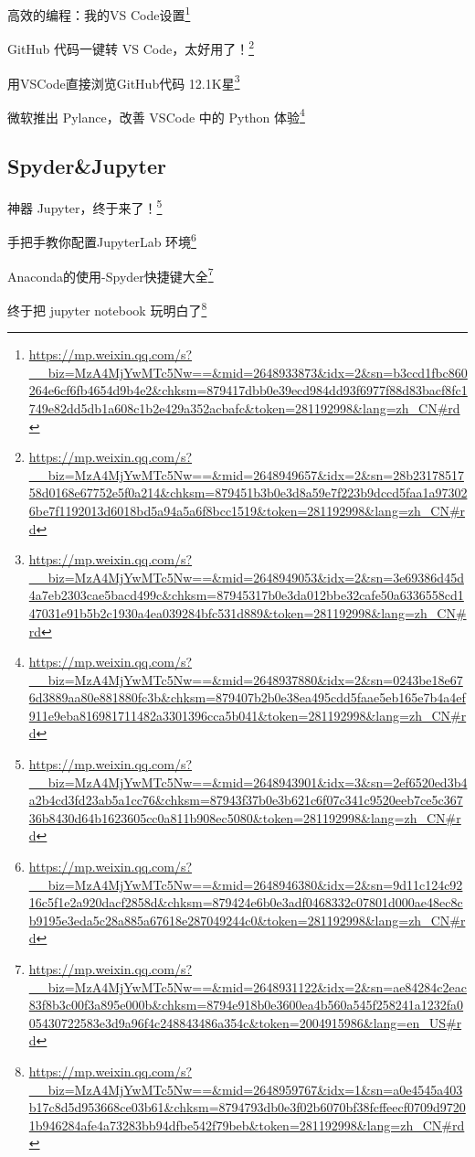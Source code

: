 \documentclass[]{ctexbook}
\renewcommand{\href}[2]{#2\footnote{\url{#1}}}
\begin{document}
\href{https://mp.weixin.qq.com/s?__biz=MzA4MjYwMTc5Nw==\&mid=2648933873\&idx=2\&sn=b3ccd1fbc860264e6cf6fb4654d9b4e2\&chksm=879417dbb0e39ecd984dd93f6977f88d83bacf8fc1749e82dd5db1a608c1b2e429a352acbafc\&token=281192998\&lang=zh_CN\#rd}{高效的编程：我的VS Code设置}

\href{https://mp.weixin.qq.com/s?__biz=MzA4MjYwMTc5Nw==\&mid=2648949657\&idx=2\&sn=28b2317851758d0168e67752e5f0a214\&chksm=879451b3b0e3d8a59e7f223b9dccd5faa1a973026be7f1192013d6018bd5a94a5a6f8bcc1519\&token=281192998\&lang=zh_CN\#rd}{GitHub 代码一键转 VS Code，太好用了！}

\href{https://mp.weixin.qq.com/s?__biz=MzA4MjYwMTc5Nw==\&mid=2648949053\&idx=2\&sn=3e69386d45d4a7eb2303cae5bacd499c\&chksm=87945317b0e3da012bbe32cafe50a6336558cd147031e91b5b2c1930a4ea039284bfc531d889\&token=281192998\&lang=zh_CN\#rd}{用VSCode直接浏览GitHub代码 \textbar{} 12.1K星}

\href{https://mp.weixin.qq.com/s?__biz=MzA4MjYwMTc5Nw==\&mid=2648937880\&idx=2\&sn=0243be18e676d3889aa80e881880fc3b\&chksm=879407b2b0e38ea495cdd5faae5eb165e7b4a4ef911e9eba816981711482a3301396cca5b041\&token=281192998\&lang=zh_CN\#rd}{微软推出 Pylance，改善 VSCode 中的 Python 体验}

\hypertarget{spyderjupyter}{%
\subsection{Spyder\&Jupyter}\label{spyderjupyter}}

\href{https://mp.weixin.qq.com/s?__biz=MzA4MjYwMTc5Nw==\&mid=2648943901\&idx=3\&sn=2ef6520ed3b4a2b4cd3fd23ab5a1cc76\&chksm=87943f37b0e3b621c6f07c341c9520eeb7ce5c36736b8430d64b1623605cc0a811b908ec5080\&token=281192998\&lang=zh_CN\#rd}{神器 Jupyter，终于来了！}

\href{https://mp.weixin.qq.com/s?__biz=MzA4MjYwMTc5Nw==\&mid=2648946380\&idx=2\&sn=9d11c124c9216c5f1e2a920dacf2858d\&chksm=879424e6b0e3adf0468332c07801d000ae48ec8cb9195e3eda5c28a885a67618e287049244c0\&token=281192998\&lang=zh_CN\#rd}{手把手教你配置JupyterLab 环境}

\href{https://mp.weixin.qq.com/s?__biz=MzA4MjYwMTc5Nw==\&mid=2648931122\&idx=2\&sn=ae84284c2eac83f8b3c00f3a895e000b\&chksm=8794e918b0e3600ea4b560a545f258241a1232fa005430722583e3d9a96f4c248843486a354c\&token=2004915986\&lang=en_US\#rd}{Anaconda的使用-Spyder快捷键大全}

\href{https://mp.weixin.qq.com/s?__biz=MzA4MjYwMTc5Nw==\&mid=2648959767\&idx=1\&sn=a0e4545a403b17c8d5d953668ce03b61\&chksm=8794793db0e3f02b6070bf38fcffeecf0709d97201b946284afe4a73283bb94dfbe542f79beb\&token=281192998\&lang=zh_CN\#rd}{终于把 jupyter notebook 玩明白了}
\end{document}
